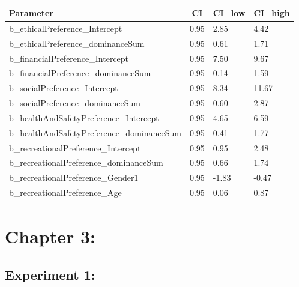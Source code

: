 \documentclass[
  donotrepeattitle,doc, 12pt, a4paper,floatsintext]{apa7}
\begin{document}
\begin{table}[tbp]

\begin{center}
\begin{threeparttable}

\caption{\label{tab:unnamed-chunk-10}}

\begin{tabular}{llll}
\toprule
Parameter & \multicolumn{1}{c}{CI} & \multicolumn{1}{c}{CI\_low} & \multicolumn{1}{c}{CI\_high}\\
\midrule
b\_ethicalPreference\_Intercept & 0.95 & 2.85 & 4.42\\
b\_ethicalPreference\_dominanceSum & 0.95 & 0.61 & 1.71\\
b\_financialPreference\_Intercept & 0.95 & 7.50 & 9.67\\
b\_financialPreference\_dominanceSum & 0.95 & 0.14 & 1.59\\
b\_socialPreference\_Intercept & 0.95 & 8.34 & 11.67\\
b\_socialPreference\_dominanceSum & 0.95 & 0.60 & 2.87\\
b\_healthAndSafetyPreference\_Intercept & 0.95 & 4.65 & 6.59\\
b\_healthAndSafetyPreference\_dominanceSum & 0.95 & 0.41 & 1.77\\
b\_recreationalPreference\_Intercept & 0.95 & 0.95 & 2.48\\
b\_recreationalPreference\_dominanceSum & 0.95 & 0.66 & 1.74\\
b\_recreationalPreference\_Gender1 & 0.95 & -1.83 & -0.47\\
b\_recreationalPreference\_Age & 0.95 & 0.06 & 0.87\\
\bottomrule
\end{tabular}

\end{threeparttable}
\end{center}

\end{table}

\hypertarget{chapter-3}{%
\section{Chapter 3:}\label{chapter-3}}

\hypertarget{experiment-1}{%
\subsection{Experiment 1:}\label{experiment-1}}
\end{document}
